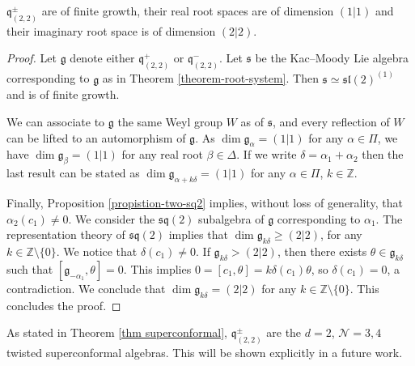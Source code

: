 \documentclass[12pt, a4paper, reqno]{amsart}
\def\NN{\mathcal{N}}
\def\q{\mathfrak{q}}
\def\l{\mathfrak{l}}
\def\s{\mathfrak{s}}
\theoremstyle{definition}
\theoremstyle{definition}
\theoremstyle{definition}
\numberwithin{theorem}{section}
\numberwithin{lemma}{section}
\numberwithin{remark}{section}
\numberwithin{definition}{section}
\numberwithin{corollary}{section}
\numberwithin{proposition}{section}
\numberwithin{example}{section}
\begin{document}
	\begin{theorem}
		\(\mathfrak{q}^\pm_{(2,2)}\) are of finite growth, their real root spaces are of dimension \((1|1)\) and their imaginary root space is of dimension \((2|2)\).
	\end{theorem}

	\begin{proof}
		Let \(\mathfrak{g}\) denote either \(\mathfrak{q}^+_{(2,2)}\) or \(\mathfrak{q}^-_{(2,2)}\). Let \(\mathfrak{s}\) be the Kac--Moody Lie algebra corresponding to \(\mathfrak{g}\) as in Theorem \ref{theorem-root-system}. Then \(\mathfrak{s} \simeq \s\l(2)^{(1)}\) and is of finite growth. 
		
		We can associate to \(\mathfrak{g}\) the same Weyl group \(W\) as of \(\mathfrak{s}\), and every reflection of \(W\) can be lifted to an automorphism of \(\mathfrak{g}\). As \(\dim \mathfrak{g}_{\alpha} = (1|1)\) for any \(\alpha \in \Pi\), we have \(\dim \mathfrak{g}_{\beta} = (1|1)\) for any real root \(\beta\in\Delta\). If we write \(\delta = \alpha_1+\alpha_2\) then the last result can be stated as \(\dim \mathfrak{g}_{\alpha+k\delta} = (1|1)\) for any \(\alpha \in \Pi\), \(k \in \mathbb{Z}\).\par
		Finally, Proposition \ref{propistion-two-sq2} implies, without loss of generality, that \(\alpha_2(c_1) \neq 0\). We consider the \(\s\q(2)\) subalgebra of \(\mathfrak{g}\) corresponding to \(\alpha_1\). The representation theory of \(\s\q(2)\) implies that \(\dim \mathfrak{g}_{k\delta} \geq (2|2)\), for any \(k \in \mathbb{Z}\setminus\{0\}\). We notice that \(\delta(c_1) \neq 0\). If \(\mathfrak{g}_{k\delta} > (2|2)\), then there exists \(\theta \in \mathfrak{g}_{k\delta}\) such that \([\mathfrak{g}_{-\alpha_1},\theta] = 0\). This implies \(0 = [c_1,\theta] = k\delta(c_1)\theta\), so \(\delta(c_1) = 0\), a contradiction. We conclude that \(\dim \mathfrak{g}_{k\delta}= (2|2)\) for any \(k \in \mathbb{Z}\setminus\{0\}\). This concludes the proof.
	\end{proof}
	
	As stated in Theorem \ref{thm superconformal}, $\q_{(2,2)}^{\pm}$ are the $d=2$, $\NN=3,4$ twisted superconformal algebras.  This will be shown explicitly in a future work.
	
\end{document}
